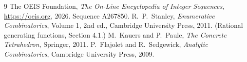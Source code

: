 \documentclass[11pt,a4paper]{article}
\theoremstyle{plain}
\theoremstyle{definition}
\begin{document}
\begin{thebibliography}{9}
 The OEIS Foundation, \emph{The On-Line Encyclopedia of Integer
Sequences}, \url{https://oeis.org}, 2026. Sequence A267850.
 R.~P.~Stanley, \emph{Enumerative Combinatorics}, Volume 1, 2nd ed.,
Cambridge University Press, 2011. (Rational generating functions, Section 4.1.)
 M.~Kauers and P.~Paule, \emph{The Concrete Tetrahedron}, Springer, 2011.
 P.~Flajolet and R.~Sedgewick, \emph{Analytic Combinatorics}, Cambridge
University Press, 2009.
\end{thebibliography}
\end{document}
